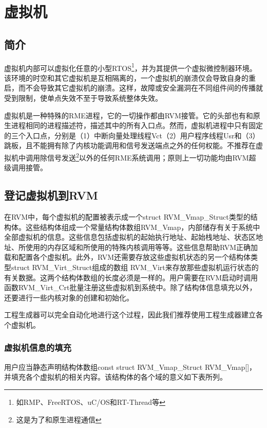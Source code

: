 \chapter{虚拟机}\label{ch:4-virtual-machines}

\section{简介}\label{sec:4-1}

虚拟机内部可以虚拟化任意的小型RTOS\footnote{如RMP、FreeRTOS、uC/OS和RT-Thread等}，并为其提供一个虚拟微控制器环境。该环境的时空和其它虚拟机是互相隔离的，一个虚拟机的崩溃仅会导致自身的重启，而不会导致其它虚拟机的崩溃。这样，故障或安全漏洞在不同组件间的传播就受到限制，使单点失效不至于导致系统整体失效。

虚拟机是一种特殊的RME进程，它的一切操作都由RVM接管。它的头部也有和原生进程相同的进程描述符，描述其中的所有入口点。然而，虚拟机进程中只有固定的三个入口点，分别是（1）中断向量处理线程Vct（2）用户程序线程Usr和（3）跳板，且不能拥有除了内核功能调用和信号发送端点之外的任何权能。不推荐在虚拟机中调用除信号发送\footnote{这是为了和原生进程通信}以外的任何RME系统调用；原则上一切功能均由RVM超级调用接管。

\section{登记虚拟机到RVM}\label{sec:4-2}

在RVM中，每个虚拟机的配置被表示成一个struct RVM\_Vmap\_Struct类型的结构体。这些结构体组成一个常量结构体数组RVM\_Vmap，内部储存有关于系统中全部虚拟机的信息。这些信息包括虚拟机的起始执行地址、起始栈地址、状态区地址、所使用的内存区域和所使用的特殊内核调用等等。这些信息帮助RVM正确加载和配置各个虚拟机。此外，RVM还需要存放这些虚拟机状态的另一个结构体类型struct RVM\_Virt\_Struct组成的数组
RVM\_Virt来存放那些虚拟机运行状态的有关数据。这两个结构体数组的长度必须是一样的。用户需要在RVM启动时调用函数RVM\_Virt\_Crt批量注册这些虚拟机到系统中。除了结构体信息填充以外，还要进行一些内核对象的创建和初始化。

工程生成器可以完全自动化地进行这个过程，因此我们推荐使用工程生成器建立各个虚拟机。

\subsection{虚拟机信息的填充}\label{subsec:4-2-1}

用户应当静态声明结构体数组const struct RVM\_Vmap\_Struct RVM\_Vmap{[}{]}，并填充各个虚拟机的相关内容。该结构体的各个域的意义如下表所列。

